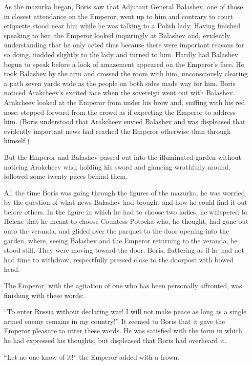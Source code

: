 As the mazurka began, Boris saw that Adjutant General Balashev,
one of those in closest attendance on the Emperor, went up to him
and contrary to court etiquette stood near him while he was
talking to a Polish lady.  Having finished speaking to her, the
Emperor looked inquiringly at Balashev and, evidently
understanding that he only acted thus because there were
important reasons for so doing, nodded slightly to the lady and
turned to him. Hardly had Balashev begun to speak before a look
of amazement appeared on the Emperor's face. He took Balashev by
the arm and crossed the room with him, unconsciously clearing a
path seven yards wide as the people on both sides made way for
him. Boris noticed Arakcheev's excited face when the sovereign
went out with Balashev.  Arakcheev looked at the Emperor from
under his brow and, sniffing with his red nose, stepped forward
from the crowd as if expecting the Emperor to address him. (Boris
understood that Arakcheev envied Balashev and was displeased that
evidently important news had reached the Emperor otherwise than
through himself.)

But the Emperor and Balashev passed out into the illuminated
garden without noticing Arakcheev who, holding his sword and
glancing wrathfully around, followed some twenty paces behind
them.

All the time Boris was going through the figures of the mazurka,
he was worried by the question of what news Balashev had brought
and how he could find it out before others. In the figure in
which he had to choose two ladies, he whispered to Helene that he
meant to choose Countess Potocka who, he thought, had gone out
onto the veranda, and glided over the parquet to the door opening
into the garden, where, seeing Balashev and the Emperor returning
to the veranda, he stood still. They were moving toward the
door. Boris, fluttering as if he had not had time to withdraw,
respectfully pressed close to the doorpost with bowed head.

The Emperor, with the agitation of one who has been personally
affronted, was finishing with these words:

``To enter Russia without declaring war! I will not make peace as
long as a single armed enemy remains in my country!'' It seemed
to Boris that it gave the Emperor pleasure to utter these
words. He was satisfied with the form in which he had expressed
his thoughts, but displeased that Boris had overheard it.

``Let no one know of it!'' the Emperor added with a frown.


